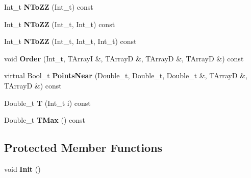 \begin{DoxyCompactItemize}
\item 
\hypertarget{classTZigZag_a1708c58772b8fd79c836be4ffa27aed7}{
Int\_\-t {\bfseries NToZZ} (Int\_\-t) const }
\label{classTZigZag_a1708c58772b8fd79c836be4ffa27aed7}

\item 
\hypertarget{classTZigZag_aa0a95dca9808abb4ba5be9ea51592cff}{
Int\_\-t {\bfseries NToZZ} (Int\_\-t, Int\_\-t) const }
\label{classTZigZag_aa0a95dca9808abb4ba5be9ea51592cff}

\item 
\hypertarget{classTZigZag_ae13318defac4d0b8be119c3101c17012}{
Int\_\-t {\bfseries NToZZ} (Int\_\-t, Int\_\-t, Int\_\-t) const }
\label{classTZigZag_ae13318defac4d0b8be119c3101c17012}

\item 
\hypertarget{classTZigZag_aa96dccdcfcb58ec5f4f391d9fbbf70ec}{
void {\bfseries Order} (Int\_\-t, TArrayI \&, TArrayD \&, TArrayD \&, TArrayD \&) const }
\label{classTZigZag_aa96dccdcfcb58ec5f4f391d9fbbf70ec}

\item 
\hypertarget{classTZigZag_a6ff0c7f8127bc2ddea94034d4f8cd26a}{
virtual Bool\_\-t {\bfseries PointsNear} (Double\_\-t, Double\_\-t, Double\_\-t \&, TArrayD \&, TArrayD \&) const }
\label{classTZigZag_a6ff0c7f8127bc2ddea94034d4f8cd26a}

\item 
\hypertarget{classTZigZag_a564a372167ee1877aae7a8d85409c051}{
Double\_\-t {\bfseries T} (Int\_\-t i) const }
\label{classTZigZag_a564a372167ee1877aae7a8d85409c051}

\item 
\hypertarget{classTZigZag_a30ccf1139de2d6ff16b0132161e8a360}{
Double\_\-t {\bfseries TMax} () const }
\label{classTZigZag_a30ccf1139de2d6ff16b0132161e8a360}

\end{DoxyCompactItemize}
\subsection*{Protected Member Functions}
\begin{DoxyCompactItemize}
\item 
\hypertarget{classTZigZag_adfd95ecde4a66eb935354ebea146637c}{
void {\bfseries Init} ()}
\label{classTZigZag_adfd95ecde4a66eb935354ebea146637c}

\end{DoxyCompactItemize}
